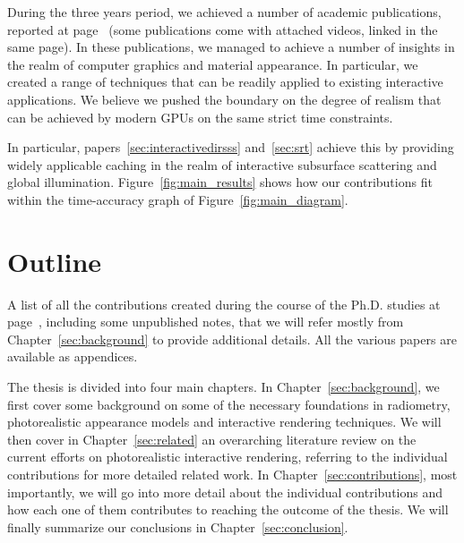 During the three years period, we achieved a number of academic publications, reported at page~\pageref{sec:contributionlist} (some publications come with attached videos, linked in the same page). In these publications, we managed to achieve a number of insights in the realm of computer graphics and material appearance. In particular, we created a range of techniques that can be readily applied to existing interactive applications. We believe we pushed the boundary on the degree of realism that can be achieved by modern GPUs on the same strict time constraints. 

In particular, papers~\ref{sec:interactivedirsss} and~\ref{sec:srt} achieve this by providing widely applicable caching in the realm of interactive subsurface scattering and global illumination. Figure~\ref{fig:main_results} shows how our contributions fit within the time-accuracy graph of Figure~\ref{fig:main_diagram}.

\section{Outline}
A list of all the contributions created during the course of the Ph.D. studies at page~\pageref{sec:contributionlist}, including some unpublished notes, that we will refer mostly from Chapter~\ref{sec:background} to provide additional details. All the various papers are available as appendices. 

The thesis is divided into four main chapters. In Chapter~\ref{sec:background}, we first cover some background on some of the necessary foundations in radiometry, photorealistic appearance models and interactive rendering techniques. We will then cover in Chapter~\ref{sec:related} an overarching literature review on the current efforts on photorealistic interactive rendering, referring to the individual contributions for more detailed related work. In Chapter~\ref{sec:contributions}, most importantly, we will go into more detail about the individual contributions and how each one of them contributes to reaching the outcome of the thesis. We will finally summarize our conclusions in Chapter~\ref{sec:conclusion}. 
